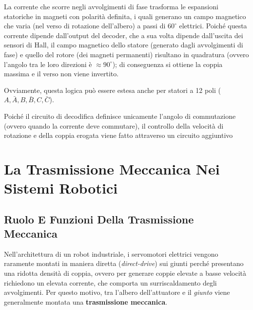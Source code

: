 ﻿\documentclass[11pt, a4paper]{article}
\begin{document}
La corrente che scorre negli avvolgimenti di fase trasforma le espansioni statoriche in magneti con polarità definita, i quali generano un campo magnetico che varia (nel verso di rotazione dell'albero) a passi di $60^\circ$ elettrici. Poiché questa corrente dipende dall'output del decoder, che a sua volta dipende dall'uscita dei sensori di Hall, il campo magnetico dello statore (generato dagli avvolgimenti di fase) e quello del rotore (dei magneti permanenti) risultano in quadratura (ovvero l'angolo tra le loro direzioni è $\approx 90^\circ$); di conseguenza si ottiene la coppia massima e il verso non viene invertito.

Ovviamente, questa logica può essere estesa anche per statori a 12 poli ($A, \bar{A}, B, \bar{B}, C, \bar{C}$).

Poiché il circuito di decodifica definisce unicamente l'angolo di commutazione (ovvero quando la corrente deve commutare), il controllo della velocità di rotazione e della coppia erogata viene fatto attraverso un circuito aggiuntivo

\newpage

\section{La Trasmissione Meccanica Nei Sistemi Robotici}

\subsection{Ruolo E Funzioni Della Trasmissione Meccanica}
Nell'architettura di un robot industriale, i servomotori elettrici vengono raramente montati in maniera diretta (\textit{direct-drive}) sui giunti perché presentano una ridotta densità di coppia, ovvero per generare coppie elevate a basse velocità richiedono un elevata corrente, che comporta un surriscaldamento degli avvolgimenti. Per questo motivo, tra l'albero dell'attuatore e il \textit{giunto} viene generalmente montata una \textbf{trasmissione meccanica}.
\end{document}
